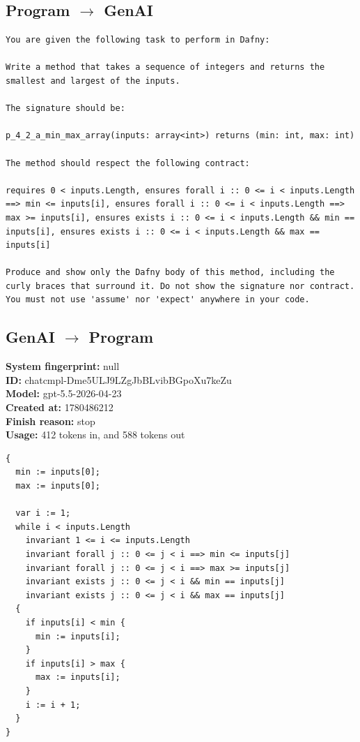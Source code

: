 \documentclass{article}
\begin{document}
\subsection*{Program $\rightarrow$ GenAI}
\begin{lstlisting}
You are given the following task to perform in Dafny:

Write a method that takes a sequence of integers and returns the smallest and largest of the inputs.

The signature should be:

p_4_2_a_min_max_array(inputs: array<int>) returns (min: int, max: int)

The method should respect the following contract:

requires 0 < inputs.Length, ensures forall i :: 0 <= i < inputs.Length ==> min <= inputs[i], ensures forall i :: 0 <= i < inputs.Length ==> max >= inputs[i], ensures exists i :: 0 <= i < inputs.Length && min == inputs[i], ensures exists i :: 0 <= i < inputs.Length && max == inputs[i]

Produce and show only the Dafny body of this method, including the curly braces that surround it. Do not show the signature nor contract. You must not use 'assume' nor 'expect' anywhere in your code.
\end{lstlisting}
\subsection*{GenAI $\rightarrow$ Program}
\textbf{System fingerprint: }null
\\\textbf{ID: }chatcmpl-Dme5ULJ9LZgJbBLvibBGpoXu7keZu
\\\textbf{Model: }gpt-5.5-2026-04-23
\\\textbf{Created at: }1780486212
\\\textbf{Finish reason: }stop
\\\textbf{Usage: }412 tokens in, and 588 tokens out
\begin{lstlisting}
{
  min := inputs[0];
  max := inputs[0];

  var i := 1;
  while i < inputs.Length
    invariant 1 <= i <= inputs.Length
    invariant forall j :: 0 <= j < i ==> min <= inputs[j]
    invariant forall j :: 0 <= j < i ==> max >= inputs[j]
    invariant exists j :: 0 <= j < i && min == inputs[j]
    invariant exists j :: 0 <= j < i && max == inputs[j]
  {
    if inputs[i] < min {
      min := inputs[i];
    }
    if inputs[i] > max {
      max := inputs[i];
    }
    i := i + 1;
  }
}
\end{lstlisting}
\end{document}
